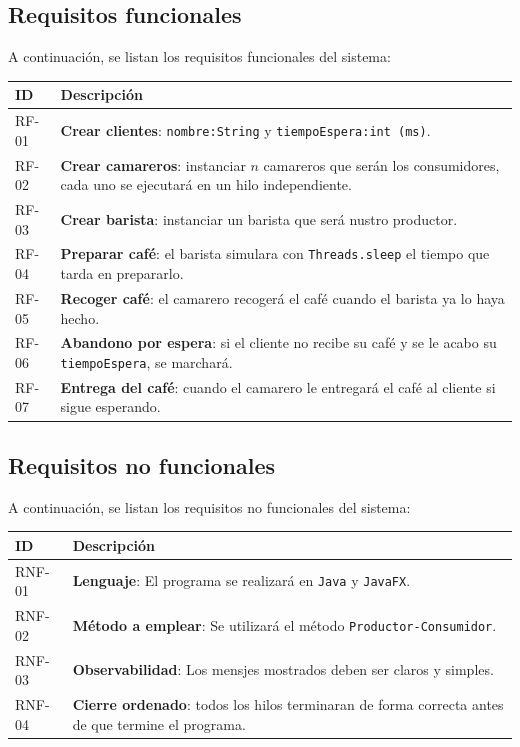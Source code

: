 \documentclass[a4paper,12pt]{report}
\begin{document}
\subsection{Requisitos funcionales}
\noindent A continuación, se listan los requisitos funcionales del sistema:
\begin{table}[H]
    \centering
    \begin{tabularx}{\linewidth}{|l|Y|}
      \hline
      \textbf{ID} & \textbf{Descripción} \\
      \hline
      RF-01 & \textbf{Crear clientes}: \texttt{nombre:String} y \texttt{tiempoEspera:int (ms)}. \\
      \hline
      RF-02 & \textbf{Crear camareros}: instanciar $n$ camareros que serán los consumidores, cada uno se ejecutará en un hilo independiente. \\
      \hline
      RF-03 & \textbf{Crear barista}: instanciar un barista que será nustro productor. \\
      \hline
      RF-04 & \textbf{Preparar café}: el barista simulara con \texttt{Threads.sleep} el tiempo que tarda en prepararlo. \\
      \hline
      RF-05 & \textbf{Recoger café}: el camarero recogerá el café cuando el barista ya lo haya hecho. \\
      \hline
      RF-06 & \textbf{Abandono por espera}: si el cliente no recibe su café y se le acabo su \texttt{tiempoEspera}, se marchará. \\
      \hline
      RF-07 & \textbf{Entrega del café}: cuando el camarero le entregará el café al cliente si sigue esperando. \\
      \hline
    \end{tabularx}
\end{table}

\subsection{Requisitos no funcionales}
\noindent A continuación, se listan los requisitos no funcionales del sistema:
\begin{table}[H]
  \centering
  \begin{tabularx}{\linewidth}{|l|Y|}
    \hline
    \textbf{ID} & \textbf{Descripción} \\
    \hline
    RNF-01 & \textbf{Lenguaje}: El programa se realizará en \texttt{Java} y \texttt{JavaFX}. \\
    \hline
    RNF-02 & \textbf{Método a emplear}: Se utilizará el método \texttt{Productor-Consumidor}. \\
    \hline
    RNF-03 & \textbf{Observabilidad}: Los mensjes mostrados deben ser claros y simples. \\
    \hline
    RNF-04 & \textbf{Cierre ordenado}: todos los hilos terminaran de forma correcta  antes de que termine el programa. \\
    \hline
  \end{tabularx}
\end{table}
\end{document}
